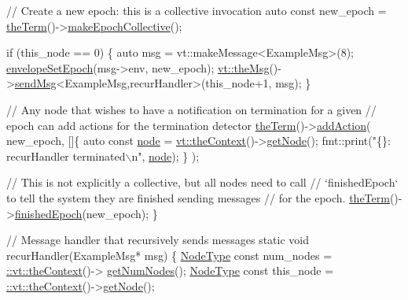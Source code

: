 \begin{DoxyCodeInclude}
  \textcolor{comment}{// Create a new epoch: this is a collective invocation}
  \textcolor{keyword}{auto} \textcolor{keyword}{const} new\_epoch = \hyperlink{namespacevt_a127580fdfcaba0b4171e5c48c5676733}{theTerm}()->\hyperlink{structvt_1_1term_1_1_termination_detector_a748dfa37925107b37bde702e6c5f4aa4}{makeEpochCollective}();

  \textcolor{keywordflow}{if} (this\_node == 0) \{
    \textcolor{keyword}{auto} msg = vt::makeMessage<ExampleMsg>(8);
    \hyperlink{namespacevt_a4a0a9928690206b588dbcac2afb71088}{envelopeSetEpoch}(msg->env, new\_epoch);
    \hyperlink{namespacevt_aeafd31f866aeb4dc6fc2f6ee97136350}{vt::theMsg}()->\hyperlink{group__preregister_ga0162a39473e7f9b490a79a7983d949ac}{sendMsg}<ExampleMsg,recurHandler>(this\_node+1, msg);
  \}

  \textcolor{comment}{// Any node that wishes to have a notification on termination for a given}
  \textcolor{comment}{// epoch can add actions for the termination detector}
  \hyperlink{namespacevt_a127580fdfcaba0b4171e5c48c5676733}{theTerm}()->\hyperlink{structvt_1_1term_1_1_term_action_a1227042cb4eb38937fb8ed34bcbdf998}{addAction}(
    new\_epoch, []\{
      \textcolor{keyword}{auto} \textcolor{keyword}{const} \hyperlink{namespacevt_1_1config_a46e57c33bee1b9f1fa95455af86d80e0a576033c81e2ddd03d721ecef3b1b3f81}{node} = \hyperlink{namespacevt_a26551fe0e6e6a1371111df5b12c7e92c}{vt::theContext}()->\hyperlink{structvt_1_1ctx_1_1_context_a0d52c263ce8516546a67443d9a86fa5f}{getNode}();
      fmt::print(\textcolor{stringliteral}{"\{\}: recurHandler terminated\(\backslash\)n"}, \hyperlink{namespacevt_1_1config_a46e57c33bee1b9f1fa95455af86d80e0a576033c81e2ddd03d721ecef3b1b3f81}{node});
    \}
  );

  \textcolor{comment}{// This is not explicitly a collective, but all nodes need to call}
  \textcolor{comment}{// `finishedEpoch` to tell the system they are finished sending messages}
  \textcolor{comment}{// for the epoch.}
  \hyperlink{namespacevt_a127580fdfcaba0b4171e5c48c5676733}{theTerm}()->\hyperlink{structvt_1_1term_1_1_termination_detector_ad54d75c50bd3f34f30247817737bc303}{finishedEpoch}(new\_epoch);
\}

\textcolor{comment}{// Message handler that recursively sends messages}
\textcolor{keyword}{static} \textcolor{keywordtype}{void} recurHandler(ExampleMsg* msg) \{
  \hyperlink{namespacevt_a866da9d0efc19c0a1ce79e9e492f47e2}{NodeType} \textcolor{keyword}{const} num\_nodes = \hyperlink{namespacevt_a26551fe0e6e6a1371111df5b12c7e92c}{::vt::theContext}()->
      \hyperlink{structvt_1_1ctx_1_1_context_a7f41071aadf6d5fa9e1b6c703c5ff19d}{getNumNodes}();
  \hyperlink{namespacevt_a866da9d0efc19c0a1ce79e9e492f47e2}{NodeType} \textcolor{keyword}{const} this\_node = \hyperlink{namespacevt_a26551fe0e6e6a1371111df5b12c7e92c}{::vt::theContext}()->\hyperlink{structvt_1_1ctx_1_1_context_a0d52c263ce8516546a67443d9a86fa5f}{getNode}();


\end{DoxyCodeInclude}
